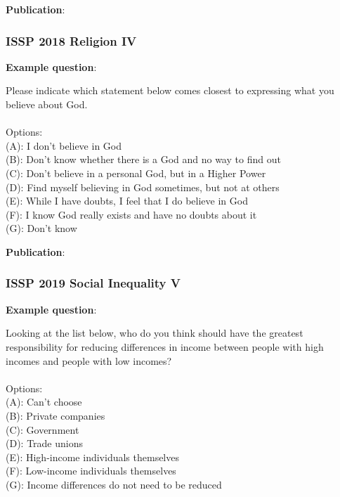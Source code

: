 \documentclass{article} %
\begin{document}
\textbf{Publication}: \cite{issp2017}

\subsubsection{ISSP 2018 Religion IV}

\textbf{Example question}:

\begin{examplebox}
Please indicate which statement below comes closest to expressing what you believe about God.
\\\\
Options:\\
(A): I don't believe in God\\
(B): Don't know whether there is a God and no way to find out\\
(C): Don't believe in a personal God, but in a Higher Power\\
(D): Find myself believing in God sometimes, but not at others\\
(E): While I have doubts, I feel that I do believe in God\\
(F): I know God really exists and have no doubts about it\\
(G): Don't know
\end{examplebox}

\textbf{Publication}: \cite{issp2018}

\subsubsection{ISSP 2019 Social Inequality V}

\textbf{Example question}:

\begin{examplebox}
Looking at the list below, who do you think should have the greatest responsibility for reducing differences in income between people with high incomes and people with low incomes?
\\\\
Options:\\
(A): Can't choose\\
(B): Private companies\\
(C): Government\\
(D): Trade unions\\
(E): High-income individuals themselves\\
(F): Low-income individuals themselves\\
(G): Income differences do not need to be reduced
\end{examplebox}
\end{document}
